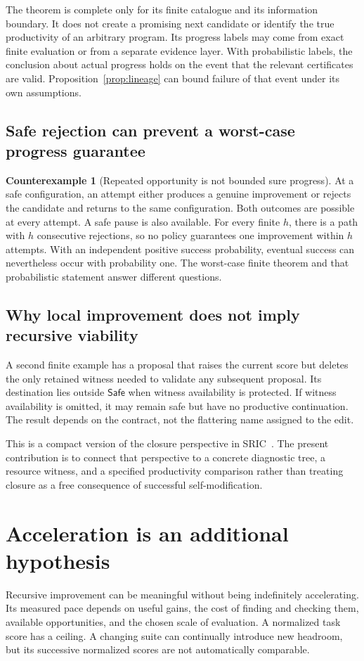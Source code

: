 \documentclass[11pt,letterpaper]{article}
\theoremstyle{plain}
\theoremstyle{definition}
\newtheorem{counterexample}[theorem]{Counterexample}
\newcommand{\Safe}{\mathsf{Safe}}\newcommand{\Post}{\operatorname{Post}}\newcommand{\Pareto}{\operatorname{Pareto}}
\begin{document}
The theorem is complete only for its finite catalogue and its information boundary. It does not create a promising next candidate or identify the true productivity of an arbitrary program. Its progress labels may come from exact finite evaluation or from a separate evidence layer. With probabilistic labels, the conclusion about actual progress holds on the event that the relevant certificates are valid. Proposition~\ref{prop:lineage} can bound failure of that event under its own assumptions.

\subsection{Safe rejection can prevent a worst-case progress guarantee}
\begin{counterexample}[Repeated opportunity is not bounded sure progress]\label{ex:retry}
At a safe configuration, an attempt either produces a genuine improvement or rejects the candidate and returns to the same configuration. Both outcomes are possible at every attempt. A safe pause is also available. For every finite $h$, there is a path with $h$ consecutive rejections, so no policy guarantees one improvement within $h$ attempts. With an independent positive success probability, eventual success can nevertheless occur with probability one. The worst-case finite theorem and that probabilistic statement answer different questions.
\end{counterexample}

\subsection{Why local improvement does not imply recursive viability}
A second finite example has a proposal that raises the current score but deletes the only retained witness needed to validate any subsequent proposal. Its destination lies outside $\Safe$ when witness availability is protected. If witness availability is omitted, it may remain safe but have no productive continuation. The result depends on the contract, not the flattering name assigned to the edit.

This is a compact version of the closure perspective in SRIC~\cite{sric}. The present contribution is to connect that perspective to a concrete diagnostic tree, a resource witness, and a specified productivity comparison rather than treating closure as a free consequence of successful self-modification.

\section{Acceleration is an additional hypothesis}\label{sec:acceleration}
Recursive improvement can be meaningful without being indefinitely accelerating. Its measured pace depends on useful gains, the cost of finding and checking them, available opportunities, and the chosen scale of evaluation. A normalized task score has a ceiling. A changing suite can continually introduce new headroom, but its successive normalized scores are not automatically comparable.
\end{document}
